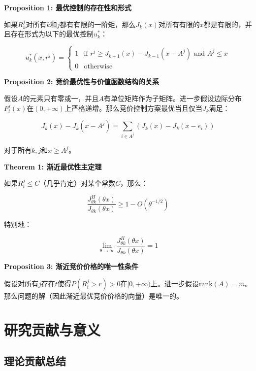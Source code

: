 \documentclass[
  10pt
]{article}
\begin{document}
\begin{propositionbox}
\textbf{Proposition 1: 最优控制的存在性和形式}

如果$R_k^j$对所有$k$和$j$都有有限的一阶矩，那么$J_k(x)$对所有有限的$x$都是有限的，并且存在形式为以下的最优控制$u_k^*$：

$$u_k^*(x,r^j) = \begin{cases}
1 & \text{if } r^j \geq J_{k-1}(x) - J_{k-1}(x - A^j) \text{ and } A^j \leq x \\
0 & \text{otherwise}
\end{cases}$$
\end{propositionbox}

\begin{propositionbox}
\textbf{Proposition 2: 竞价最优性与价值函数结构的关系}

假设$A$的元素只有零或一，并且$A$有单位矩阵作为子矩阵。进一步假设边际分布$F_t^j(x)$在$(0, +\infty)$上严格递增。那么竞价控制方案最优当且仅当$J_k$满足：

$$J_k(x) - J_k(x - A^j) = \sum_{i \in A^j} (J_k(x) - J_k(x - e_i))$$

对于所有$k, j$和$x \geq A^j$。
\end{propositionbox}

\begin{theorembox}
\textbf{Theorem 1: 渐近最优性主定理}

如果$R_t^j \leq C$（几乎肯定）对某个常数$C$，那么：

$$\frac{J_{\theta k}^H(\theta x)}{J_{\theta k}(\theta x)} \geq 1 - O(\theta^{-1/2})$$

特别地：

$$\lim_{\theta \to \infty} \frac{J_{\theta k}^H(\theta x)}{J_{\theta k}(\theta x)} = 1$$
\end{theorembox}

\begin{propositionbox}
\textbf{Proposition 3: 渐近竞价价格的唯一性条件}

假设对所有$j$存在$t$使得$P(R_t^j > r) > 0$在$[0, +\infty)$上。进一步假设$\text{rank}(A) = m$。那么问题的解（因此渐近最优竞价价格的向量）是唯一的。
\end{propositionbox}

\section{研究贡献与意义}

\subsection{理论贡献总结}
\end{document}
